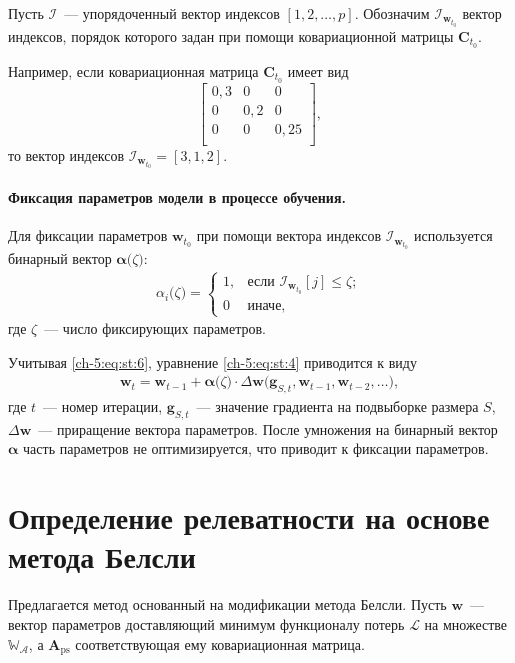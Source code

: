 Пусть $\mathcal{I}$~---  упорядоченный вектор индексов $[1, 2, \ldots, p]$. Обозначим $\mathcal{I}_{\textbf{w}_{t_0}}$ вектор индексов, порядок которого задан при помощи ковариационной матрицы $\textbf{C}_{t_0}$. 
 
Например, если ковариационная матрица $\textbf{C}_{t_0}$  имеет вид
 $$
\begin{bmatrix}
0{,}3& 0 & 0\\
0& 0{,}2 & 0\\
0& 0 & 0{,}25\\
\end{bmatrix},
 $$
 то вектор индексов $\mathcal{I}_{\textbf{w}_{t_0}} = [3,1,2]$.
 
\paragraph{Фиксация параметров модели в процессе обучения.}
Для фиксации параметров $\textbf{w}_{t_0}$ при помощи вектора индексов $\mathcal{I}_{\textbf{w}_{t_0}}$ используется бинарный вектор $\bm{\alpha}\bigr(\zeta\bigr)$:
\[
\label{ch-5:eq:st:6}
\begin{aligned}
\alpha_i\bigr(\zeta\bigr) = \begin{cases}
   1, &\text{если }\mathcal{I}_{\textbf{w}_{t_0}}[j] \leq \zeta;\\
   0 &\text{иначе},
 \end{cases}
\end{aligned}
\]
 где $\zeta$~--- число фиксирующих параметров.
 
 Учитывая \eqref{ch-5:eq:st:6}, уравнение \eqref{ch-5:eq:st:4} приводится к виду
 \[
\label{ch-5:eq:st:7}
\begin{aligned}
\textbf{w}_{t} = \textbf{w}_{t-1} + \bm{\alpha}\bigr(\zeta\bigr)\cdot\Delta\textbf{w}\bigr(\textbf{g}_{S,t}, \textbf{w}_{t-1}, \textbf{w}_{t-2}, \ldots\bigr),
\end{aligned}
\]
где $t$~--- номер итерации, $\textbf{g}_{S,t}$~--- значение градиента на подвыборке размера $S$, $\Delta\textbf{w}$~--- приращение вектора параметров. После умножения на бинарный вектор $\bm\alpha$ часть параметров не оптимизируется, что приводит к фиксации параметров.

\section{Определение релеватности на основе метода Белсли}
Предлагается метод основанный на модификации метода Белсли. Пусть $\textbf{w}$~--- вектор параметров доставляющий минимум функционалу потерь $\mathcal{L}$ на  множестве $\mathbb{W_\mathcal{A}}$, а $\textbf{A}_\text{ps}$ соответствующая ему ковариационная матрица.

